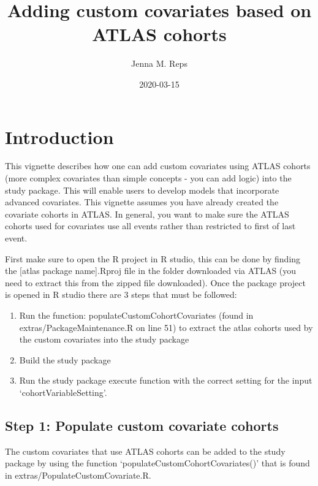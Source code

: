 \documentclass[
]{article}
\title{Adding custom covariates based on ATLAS cohorts}
\author{Jenna M. Reps}
\date{2020-03-15}
\providecommand{\tightlist}{%
  \setlength{\itemsep}{0pt}\setlength{\parskip}{0pt}}
\begin{document}
\maketitle

{
\setcounter{tocdepth}{2}
\tableofcontents
}
\hypertarget{introduction}{%
\section{Introduction}\label{introduction}}

This vignette describes how one can add custom covariates using ATLAS
cohorts (more complex covariates than simple concepts - you can add
logic) into the study package. This will enable users to develop models
that incorporate advanced covariates. This vignette assumes you have
already created the covariate cohorts in ATLAS. In general, you want to
make sure the ATLAS cohorts used for covariates use all events rather
than restricted to first of last event.

First make sure to open the R project in R studio, this can be done by
finding the {[}atlas package name{]}.Rproj file in the folder downloaded
via ATLAS (you need to extract this from the zipped file downloaded).
Once the package project is opened in R studio there are 3 steps that
must be followed:

\begin{enumerate}
\def\labelenumi{\arabic{enumi}.}
\tightlist
\item
  Run the function: populateCustomCohortCovariates (found in
  extras/PackageMaintenance.R on line 51) to extract the atlas cohorts
  used by the custom covariates into the study package
\item
  Build the study package
\item
  Run the study package execute function with the correct setting for
  the input `cohortVariableSetting'.
\end{enumerate}

\hypertarget{step-1-populate-custom-covariate-cohorts}{%
\subsection{Step 1: Populate custom covariate
cohorts}\label{step-1-populate-custom-covariate-cohorts}}

The custom covariates that use ATLAS cohorts can be added to the study
package by using the function `populateCustomCohortCovariates()' that is
found in extras/PopulateCustomCovariate.R.
\end{document}
